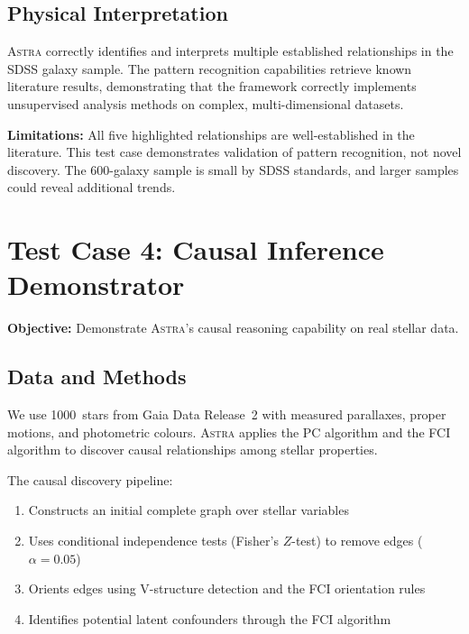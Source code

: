 \documentclass[usenatbib]{rasti}
\newcommand{\astra}{\textsc{Astra}\xspace}
\newcommand{\pc}{PC\xspace}
\newcommand{\fci}{FCI\xspace}
\begin{document}
\subsection{Physical Interpretation}
\label{sec:tc3:interpretation}

\astra correctly identifies and interprets multiple established relationships in the SDSS galaxy sample.
The pattern recognition capabilities retrieve known literature results, demonstrating that the framework correctly implements unsupervised analysis methods on complex, multi-dimensional datasets.

\textbf{Limitations:} All five highlighted relationships are well-established in the literature.
This test case demonstrates validation of pattern recognition, not novel discovery.
The 600-galaxy sample is small by SDSS standards, and larger samples could reveal additional trends.

\section{Test Case 4: Causal Inference Demonstrator}
\label{sec:tc4}

\textbf{Objective:} Demonstrate \astra's causal reasoning capability on real stellar data.

\subsection{Data and Methods}
\label{sec:tc4:data}

We use 1000~stars from Gaia Data Release~2 \citep{GaiaCollaboration2018} with measured parallaxes, proper motions, and photometric colours.
\astra applies the \pc algorithm \citep{Spirtes2000} and the \fci algorithm \citep{Zhang2008} to discover causal relationships among stellar properties.

The causal discovery pipeline:
\begin{enumerate}
  \item[(i)] Constructs an initial complete graph over stellar variables
  \item[(ii)] Uses conditional independence tests (Fisher's $Z$-test) to remove edges ($\alpha = 0.05$)
  \item[(iii)] Orients edges using V-structure detection and the \fci orientation rules
  \item[(iv)] Identifies potential latent confounders through the \fci algorithm
\end{enumerate}
\end{document}
